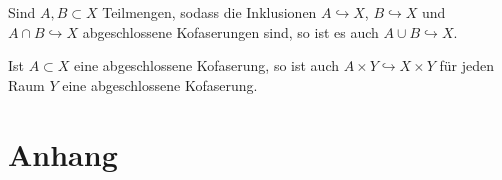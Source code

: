 \newpage
{}
\begin{satz}
	Sind $A,B \subset X$ Teilmengen, sodass die Inklusionen $A \hookrightarrow X$, $B \hookrightarrow X$ und $A \cap B \hookrightarrow X$ abgeschlossene Kofaserungen sind, so ist es auch $A \cup B \hookrightarrow X$.
\end{satz}
\begin{satz}
	Ist $A \subset X$ eine abgeschlossene Kofaserung, so ist auch $A \times Y \hookrightarrow X \times Y$ für jeden Raum $Y$ eine abgeschlossene Kofaserung.
\end{satz}

\cleardoubleoddemptypage
{}
\setcounter{page}{1}
\cleardoubleoddemptypage
\appendix

\section{Anhang} %
\label{sec:anhang}

\printindex
\printbibliography
\listoffigures
\todototoc
{}

